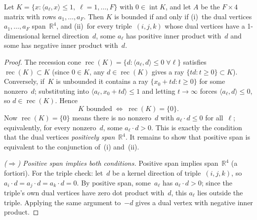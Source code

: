 \begin{unverified}
\begin{proposition}\label{prop:boundedness-iff}
Let $K = \{x : \langle a_\ell, x \rangle \le 1,\; \ell = 1, \ldots, F\}$
with $0 \in \operatorname{int} K$, and let $A$ be the $F \times 4$ matrix
with rows $a_1, \ldots, a_F$. Then $K$ is
bounded if and only if
\textup{(i)}~the dual vertices $a_1, \ldots, a_F$ span~$\mathbb{R}^4$, and
\textup{(ii)}~for every triple~$(i,j,k)$ whose dual vertices have a 1-dimensional
kernel direction~$d$, some $a_\ell$ has positive inner product with~$d$ and some
has negative inner product with~$d$.
\end{proposition}

\begin{proof}
The recession cone $\operatorname{rec}(K) = \{d : \langle a_\ell, d \rangle \le 0\;\forall \ell\}$ satisfies
$\operatorname{rec}(K) \subset K$ (since $0 \in K$, any $d \in
\operatorname{rec}(K)$ gives a ray $\{td : t \ge 0\} \subset K$).
Conversely, if~$K$ is unbounded it contains a ray $\{x_0 + td : t \ge 0\}$
for some nonzero~$d$; substituting into $\langle a_\ell, x_0 + td \rangle \le 1$ and letting
$t \to \infty$ forces $\langle a_\ell, d \rangle \le 0$, so $d \in \operatorname{rec}(K)$.  Hence
\[
  K \text{ bounded}
  \;\Longleftrightarrow\;
  \operatorname{rec}(K) = \{0\}.
\]
Now $\operatorname{rec}(K) = \{0\}$ means there is no nonzero~$d$ with
$a_\ell \cdot d \le 0$ for all~$\ell$; equivalently, for every nonzero~$d$,
some $a_\ell \cdot d > 0$.  This is exactly the condition that the dual vertices
\emph{positively span}~$\mathbb{R}^4$.  It remains to show that positive span
is equivalent to the conjunction of~\textup{(i)} and~\textup{(ii)}.

\medskip\noindent\emph{($\Rightarrow$) Positive span implies both conditions.}
Positive span implies span~$\mathbb{R}^4$ (a fortiori). For the triple check:
let~$d$ be a kernel direction of triple~$(i,j,k)$, so $a_i \cdot d = a_j
\cdot d = a_k \cdot d = 0$. By positive span, some~$a_\ell$ has $a_\ell \cdot
d > 0$; since the triple's own dual vertices have zero dot product with~$d$, this
$a_\ell$ lies outside the triple. Applying the same argument to~$-d$ gives a
dual vertex with negative inner product.


\end{proof}
\end{unverified}
